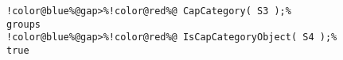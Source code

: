 \begin{Verbatim}[commandchars=!@\%,frame=single]
!color@blue%@gap>%!color@red%@ CapCategory( S3 );%
groups
!color@blue%@gap>%!color@red%@ IsCapCategoryObject( S4 );%
true
\end{Verbatim}
